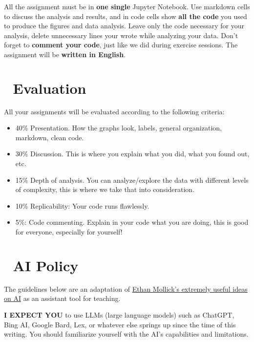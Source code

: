 \documentclass[
  letterpaper,
  DIV=11,
  numbers=noendperiod]{scrreprt}
\providecommand{\tightlist}{%
  \setlength{\itemsep}{0pt}\setlength{\parskip}{0pt}}\usepackage{longtable,booktabs,array}
\begin{document}

All the assignment must be in \textbf{one single} Jupyter Notebook. Use
markdown cells to discuss the analysis and results, and in code cells
show \textbf{all the code} you used to produce the figures and data
analysis. Leave only the code necessary for your analysis, delete
unnecessary lines your wrote while analyzing your data. Don't forget to
\textbf{comment your code}, just like we did during exercise sessions.
The assignment will be \textbf{written in English}.

\hypertarget{evaluation}{%
\section*{💯 Evaluation}\label{evaluation}}


All your assignments will be evaluated according to the following
criteria:

\begin{itemize}
\tightlist
\item
  40\% Presentation. How the graphs look, labels, general organization,
  markdown, clean code.
\item
  30\% Discussion. This is where you explain what you did, what you
  found out, etc.
\item
  15\% Depth of analysis. You can analyze/explore the data with
  different levels of complexity, this is where we take that into
  consideration.
\item
  10\% Replicability: Your code runs flawlessly.
\item
  5\%: Code commenting. Explain in your code what you are doing, this is
  good for everyone, especially for yourself!
\end{itemize}

\hypertarget{ai-policy}{%
\section*{🤖 AI Policy}\label{ai-policy}}


The guidelines below are an adaptation of
\href{https://oneusefulthing.substack.com/p/all-my-classes-suddenly-became-ai}{Ethan
Mollick's extremely useful ideas on AI} as an assistant tool for
teaching.

\textbf{I EXPECT YOU} to use LLMs (large language models) such as
ChatGPT, Bing AI, Google Bard, Lex, or whatever else springs up since
the time of this writing. You should familiarize yourself with the AI's
capabilities and limitations.
\end{document}
